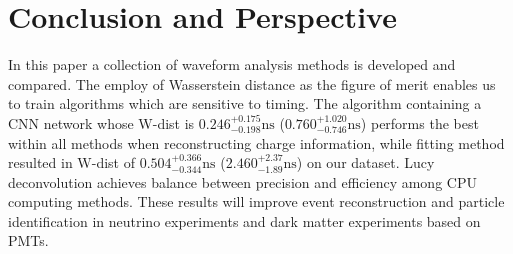 \section{Conclusion and Perspective} %
\label{sec:conclusion}

In this paper a collection of waveform analysis methods is developed and compared. The employ of Wasserstein distance as the figure of merit enables us to train algorithms which are sensitive to timing. The algorithm containing a CNN network whose W-dist is $0.246^{+0.175}_{-0.198}\mathrm{ns}$ ($0.760^{+1.020}_{-0.746}\mathrm{ns}$) performs the best within all methods when reconstructing charge information, while fitting method resulted in W-dist of $0.504^{+0.366}_{-0.344}\mathrm{ns}$ ($2.460^{+2.37}_{-1.89}\mathrm{ns}$) on our dataset. Lucy deconvolution achieves balance between precision and efficiency among CPU computing methods. These results will improve event reconstruction and particle identification in neutrino experiments and dark matter experiments based on PMTs. 

